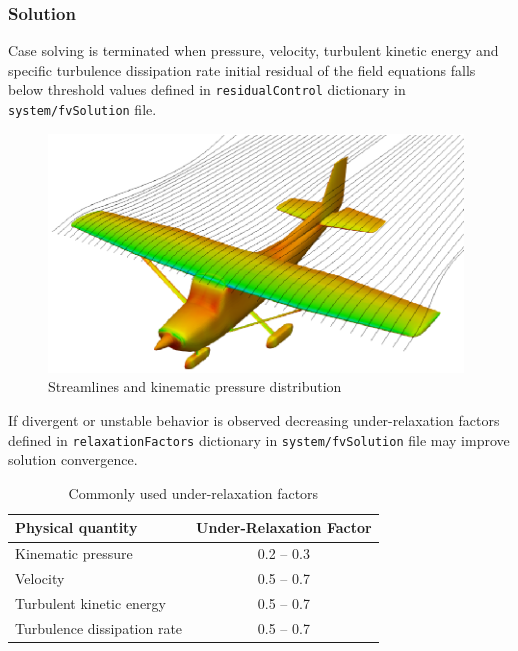 \subsubsection{Solution}

Case solving is terminated when pressure, velocity, turbulent kinetic energy and specific turbulence dissipation rate initial residual of the field equations falls below threshold values defined in \texttt{residualControl} dictionary in \texttt{system/fvSolution} file.

\begin{figure}[h!]
  \centering
  \includegraphics[width=110mm]{eps/openfoam_results.eps}
  \caption{Streamlines and kinematic pressure distribution}
\end{figure}

If divergent or unstable behavior is observed decreasing under-relaxation factors defined in \texttt{relaxationFactors} dictionary in \texttt{system/fvSolution} file may improve solution convergence.
\begin{table}[h!]
  \begin{center}
    \begin{tabular}{ l | c }
      \toprule
      \textbf{Physical quantity} & \textbf{Under-Relaxation Factor} \\ \midrule
      Kinematic pressure          & 0.2 -- 0.3 \\
      Velocity                    & 0.5 -- 0.7 \\
      Turbulent kinetic energy    & 0.5 -- 0.7 \\
      Turbulence dissipation rate & 0.5 -- 0.7 \\
      \bottomrule
    \end{tabular}
    \caption{Commonly used under-relaxation factors \cite{FluentUserGuide15, Guerrero2018} }
  \end{center}
\end{table}

